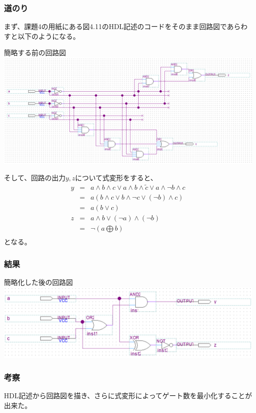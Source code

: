 \documentclass[a4paper]{jarticle}
\begin{document}
\subsubsection{道のり}
まず、課題4の用紙にある図4.11のHDL記述のコードをそのまま回路図であらわすと以下のようになる。
\begin{center}
	簡略する前の回路図
	\includegraphics[width=15cm]{2-l-1.PNG}
\end{center}
そして、回路の出力$y,z$について式変形をすると、
\begin{eqnarray*}
	y & = & a \land b \land c \lor a \land b \land \tilde{c} \lor a \land \lnot b \land c \nonumber \\
	  & = & a \left( b \land c \lor b \land \lnot c \lor \left( \lnot b \right) \land c \right) \nonumber \\
	  & = & a \left( b \lor c \right) \nonumber \\
	z & = & a \land b \lor \left( \lnot a \right) \land \left( \lnot b \right) \nonumber \\
	  & = & \lnot \left( a \bigoplus b \right) \nonumber \\
\end{eqnarray*}
となる。
\subsubsection{結果}
\begin{center}
	簡略化した後の回路図
	\includegraphics[width=15cm]{2-l-2.PNG}
\end{center}
\subsubsection{考察}
HDL記述から回路図を描き、さらに式変形によってゲート数を最小化することが出来た。
\end{document}
